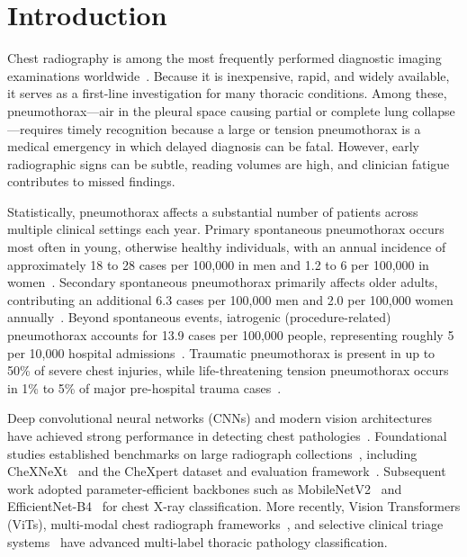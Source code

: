 \documentclass[diagnostics,article,submit,moreauthors]{Definitions/mdpi}
\begin{document}
\section{Introduction}
\label{sec:intro}

Chest radiography is among the most frequently performed diagnostic imaging examinations worldwide~\cite{diagnostics1}. Because it is inexpensive, rapid, and widely available, it serves as a first-line investigation for many thoracic conditions. Among these, pneumothorax---air in the pleural space causing partial or complete lung collapse---requires timely recognition because a large or tension pneumothorax is a medical emergency in which delayed diagnosis can be fatal. However, early radiographic signs can be subtle, reading volumes are high, and clinician fatigue contributes to missed findings.

Statistically, pneumothorax affects a substantial number of patients across multiple clinical settings each year. Primary spontaneous pneumothorax occurs most often in young, otherwise healthy individuals, with an annual incidence of approximately 18 to 28 cases per 100,000 in men and 1.2 to 6 per 100,000 in women~\cite{roberts2023bts, tschopp2015ers}. Secondary spontaneous pneumothorax primarily affects older adults, contributing an additional 6.3 cases per 100,000 men and 2.0 per 100,000 women annually~\cite{roberts2023bts}. Beyond spontaneous events, iatrogenic (procedure-related) pneumothorax accounts for 13.9 cases per 100,000 people, representing roughly 5 per 10,000 hospital admissions~\cite{roberts2023bts}. Traumatic pneumothorax is present in up to 50\% of severe chest injuries, while life-threatening tension pneumothorax occurs in 1\% to 5\% of major pre-hospital trauma cases~\cite{roberts2023bts}.

Deep convolutional neural networks (CNNs) and modern vision architectures have achieved strong performance in detecting chest pathologies~\cite{diagnostics1}. Foundational studies established benchmarks on large radiograph collections~\cite{diagnostics2}, including CheXNeXt~\cite{rajpurkar2018chexnext} and the CheXpert dataset and evaluation framework~\cite{irvin2019chexpert}. Subsequent work adopted parameter-efficient backbones such as MobileNetV2~\cite{sandler2018mobilenetv2, sharma2025mobilenetv2} and EfficientNet-B4~\cite{tan2019efficientnet, chen2026efficientnet} for chest X-ray classification. More recently, Vision Transformers (ViTs), multi-modal chest radiograph frameworks~\cite{patel2025vision, Cristea2026}, and selective clinical triage systems~\cite{gupta2026calibrated} have advanced multi-label thoracic pathology classification.
\end{document}
